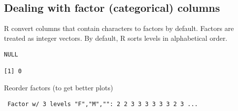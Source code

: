\documentclass[
  letterpaper,
  DIV=11,
  numbers=noendperiod]{scrreprt}
\newenvironment{Shaded}{\begin{snugshade}}{\end{snugshade}}
\newcommand{\AttributeTok}[1]{\textcolor[rgb]{0.40,0.45,0.13}{#1}}
\newcommand{\FunctionTok}[1]{\textcolor[rgb]{0.28,0.35,0.67}{#1}}
\newcommand{\NormalTok}[1]{\textcolor[rgb]{0.00,0.23,0.31}{#1}}
\newcommand{\OtherTok}[1]{\textcolor[rgb]{0.00,0.23,0.31}{#1}}
\newcommand{\SpecialCharTok}[1]{\textcolor[rgb]{0.37,0.37,0.37}{#1}}
\newcommand{\StringTok}[1]{\textcolor[rgb]{0.13,0.47,0.30}{#1}}
\begin{document}
\subsection{Dealing with factor (categorical)
columns}\label{dealing-with-factor-categorical-columns}

R convert columns that contain characters to factors by default. Factors
are treated as integer vectors. By default, R sorts levels in
alphabetical order.

\begin{Shaded}
\end{Shaded}

\begin{verbatim}
NULL
\end{verbatim}

\begin{Shaded}
\end{Shaded}

\begin{verbatim}
[1] 0
\end{verbatim}

Reorder factors (to get better plots)

\begin{Shaded}
\end{Shaded}

\begin{verbatim}
 Factor w/ 3 levels "F","M","": 2 2 3 3 3 3 3 3 2 3 ...
\end{verbatim}

\begin{Shaded}
\end{Shaded}
\end{document}
